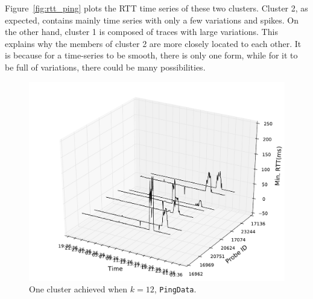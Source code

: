 Figure~\ref{fig:rtt_ping} plots the RTT time series of these two clusters. Cluster 2, as expected, contains mainly time series with only a few variations and spikes. 
On the other hand, cluster 1 is composed of traces with large variations.
This explains why the members of cluster 2 are more closely located to each other. 
It is because for a time-series to be smooth, there is only one form, while for it to be full of variations, there could be many possibilities.

\begin{figure}[!htb]
\centering
\includegraphics[width=\textwidth]{gfx/chap3/rtt3d_ft_pam_cls8.pdf}
\caption{One cluster achieved when $k=12$, \texttt{PingData}.}
\label{fig:cls8_k12}
\end{figure}

